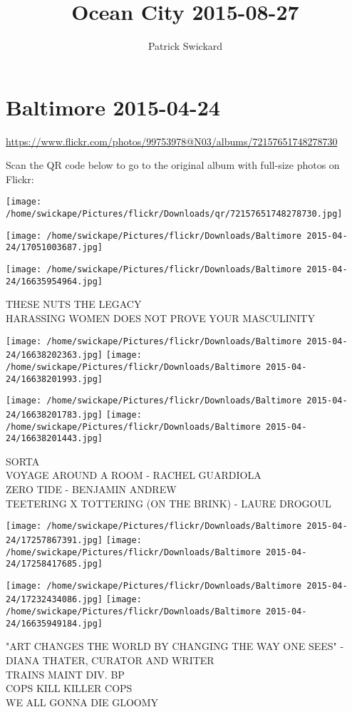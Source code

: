 \documentclass[10pt,letterpaper]{article}
\title{Ocean City 2015-08-27}
\author{Patrick Swickard}
\date{}
\begin{document}
\section*{Baltimore 2015-04-24}

\url{https://www.flickr.com/photos/99753978@N03/albums/72157651748278730}

Scan the QR code below to go to the original album with full-size photos on Flickr:

\texttt{[image: /home/swickape/Pictures/flickr/Downloads/qr/72157651748278730.jpg]}
\pagebreak

\texttt{[image: /home/swickape/Pictures/flickr/Downloads/Baltimore 2015-04-24/17051003687.jpg]}

\vspace{0.25in}
\texttt{[image: /home/swickape/Pictures/flickr/Downloads/Baltimore 2015-04-24/16635954964.jpg]}

THESE NUTS THE LEGACY\\
HARASSING WOMEN DOES NOT PROVE YOUR MASCULINITY
\pagebreak

\texttt{[image: /home/swickape/Pictures/flickr/Downloads/Baltimore 2015-04-24/16638202363.jpg]}
\texttt{[image: /home/swickape/Pictures/flickr/Downloads/Baltimore 2015-04-24/16638201993.jpg]}

\texttt{[image: /home/swickape/Pictures/flickr/Downloads/Baltimore 2015-04-24/16638201783.jpg]}
\texttt{[image: /home/swickape/Pictures/flickr/Downloads/Baltimore 2015-04-24/16638201443.jpg]}

SORTA\\
VOYAGE AROUND A ROOM {-} RACHEL GUARDIOLA\\
ZERO TIDE {-} BENJAMIN ANDREW\\
TEETERING X TOTTERING (ON THE BRINK) {-} LAURE DROGOUL
\pagebreak

\texttt{[image: /home/swickape/Pictures/flickr/Downloads/Baltimore 2015-04-24/17257867391.jpg]}
\texttt{[image: /home/swickape/Pictures/flickr/Downloads/Baltimore 2015-04-24/17258417685.jpg]}

\texttt{[image: /home/swickape/Pictures/flickr/Downloads/Baltimore 2015-04-24/17232434086.jpg]}
\texttt{[image: /home/swickape/Pictures/flickr/Downloads/Baltimore 2015-04-24/16635949184.jpg]}

"ART CHANGES THE WORLD BY CHANGING THE WAY ONE SEES" {-} DIANA THATER, CURATOR AND WRITER\\
TRAINS MAINT DIV. BP\\
COPS KILL KILLER COPS\\
WE ALL GONNA DIE GLOOMY
\pagebreak
\end{document}
